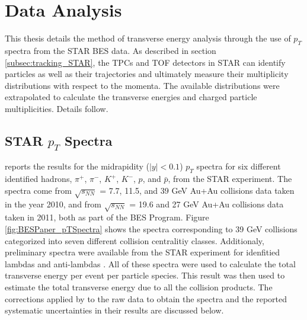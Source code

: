 \chapter{Data Analysis} \label{ch:analysis}
This thesis details the method of transverse energy analysis through the use of $p_{T}$ spectra from the STAR BES data. As described in section \ref{subsec:tracking_STAR}, the TPCs and TOF detectors in STAR can identify particles as well as their trajectories and ultimately measure their multiplicity distributions with respect to the momenta. The available distributions were extrapolated to calculate the transverse energies and charged particle multiplicities. Details follow.

\section{STAR $p_{T}$ Spectra}
\citet{PhysRevC.96.044904} reports the results for the midrapidity ($\left|{y}\right| < 0.1$) $p_{T}$ spectra for six different identified hadrons, $\pi^+$, $\pi^-$, $K^+$, $K^-$, $p$, and $\bar{p}$, from the STAR experiment. The spectra come from $\sqrt{s_{NN}}$ = 7.7, 11.5, and 39 GeV Au+Au collisions data taken in the year 2010, and from $\sqrt{s_{NN}}$ = 19.6 and 27 GeV Au+Au collisions data taken in 2011, both as part of the BES Program. Figure \ref{fig:BESPaper_pTSpectra} \cite{PhysRevC.96.044904} shows the spectra corresponding to 39 GeV collisions categorized into seven different collision centralitiy classes. Additionaly, preliminary spectra were available from the STAR experiment for idenfitied lambdas and anti-lambdas \cite{YePrivateCommunication}. All of these spectra were used to calculate the total transverse energy per event per particle species. This result was then used to estimate the total transverse energy due to all the collision products. The corrections applied by \citet{PhysRevC.96.044904} to the raw data to obtain the spectra and the reported systematic uncertainties in their results are discussed below.
